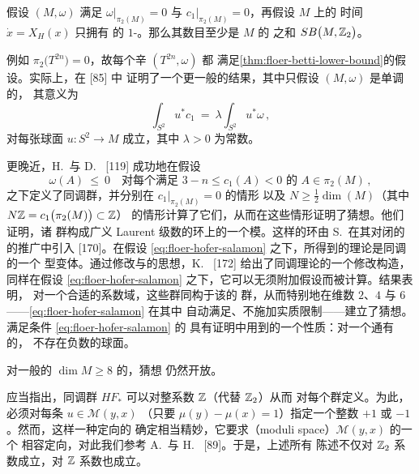 \begin{theorem}[\trFloer]\label{thm:floer-betti-lower-bound}
假设\trCompact\trSymplecticManifold{} $(M,\omega)$ 满足%
$\omega\big|_{\pi_{2}(M)}=0$ 与 $c_{1}\big|_{\pi_{2}(M)}=0$，再假设 $M$ 上的%
时间\trPeriodic\trHamiltonianVectorField{} $\dot{x}=X_{H}(x)$ 只拥有%
\trNondegenerate{}的 $1$-\trPeriodicSolution。那么其数目至少是 $M$ 的%
\trBettiNumber{}之和 $SB\bigl(M,\mathbb{Z}_{2}\bigr)$。
\end{theorem}

例如 $\pi_{2}\bigl(T^{2n}\bigr)=0$，故每个辛\trTorus{} $(T^{2n},\omega)$ 都%
满足\cref{thm:floer-betti-lower-bound}的假设。实际上，\trFloer{}在 [85] 中%
证明了一个更一般的结果，其中只假设 $(M,\omega)$ 是单调的，%
其意义为
\begin{equation}\label{eq:floer-monotone}
\int_{S^{2}}u^{*}c_{1}\ =\ \lambda\int_{S^{2}}u^{*}\omega\,,
\end{equation}
对每张球面 $u:S^{2}\to M$ 成立，其中 $\lambda>0$ 为常数。

更晚近，H.~\trHofer{}与 D.~\trSalamon{} [119] 成功地在假设
\begin{equation}\label{eq:floer-hofer-salamon}
\omega(A)\ \leq\ 0\quad\text{对每个满足 }3-n\leq c_{1}(A)<0\text{ 的 }A\in\pi_{2}(M)\,,
\end{equation}
之下定义了\trFloer{}同调群，并分别在 $c_{1}\big|_{\pi_{2}(M)}=0$ 的情形%
以及 $N\geq\frac{1}{2}\dim(M)$（其中 $N\mathbb{Z}=c_{1}\bigl(\pi_{2}(M)\bigr)\subset\mathbb{Z}$）%
的情形计算了它们，从而在这些情形证明了\trArnold{}猜想。他们证明，诸%
\trFloer{}群构成广义 Laurent 级数的\trNovikov{}环上的一个模。这样的环由%
S.~\trNovikov{}在其对闭\trOneForm{}的\trMorseTheory{}的推广中引入 [170]。在假设%
\eqref{eq:floer-hofer-salamon} 之下，所得到的理论是\trFloer{}同调的一个%
\trNovikov{}型变体。通过修改\trHofer{}与\trSalamon{}的思想，K.~\trOno{} [172]%
给出了\trFloer{}同调理论的一个修改构造，同样在假设%
\eqref{eq:floer-hofer-salamon} 之下，它可以无须附加假设而被计算。结果表明，%
对一个合适的系数域，这些\trFloer{}群同构于该\trManifold{}的\trSingularHomology%
群，从而特别地在维数 $2$、$4$ 与 $6$——\eqref{eq:floer-hofer-salamon} 在其中%
自动满足、不施加实质限制——建立了\trArnold{}猜想。满足条件 \eqref{eq:floer-hofer-salamon} 的%
\trManifold{}具有证明中用到的一个性质：对一个通有的\trAlmostComplexStructure，%
不存在负\trChern{}数的\trHolomorphic{}球面。

对一般的 $\dim M\geq8$ 的\trCompact\trSymplecticManifold，\trArnold{}猜想%
仍然开放。

应当指出，\trFloer{}同调群 $HF_{*}$ 可以对整系数 $\mathbb{Z}$（代替 $\mathbb{Z}_{2}$）从而%
对每个\trAbelian{}群定义。为此，必须对每条\trConnectingOrbit{} $u\in\mathcal{M}(y,x)$%
（只要 $\mu(y)-\mu(x)=1$）指定一个整数 $+1$ 或 $-1$。然而，这样一种定向的%
确定相当精妙，它要求\textbf{\trModuliSpace}（moduli space）$\mathcal{M}(y,x)$ 的一个%
相容定向，对此我们参考 A.~\trFloer{}与 H.~\trHofer{} [89]。于是，上述所有%
陈述不仅对 $\mathbb{Z}_{2}$ 系数成立，对 $\mathbb{Z}$ 系数也成立。

